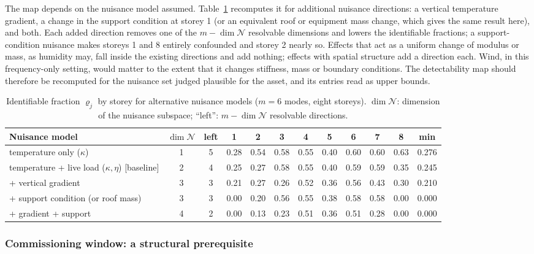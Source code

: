 \documentclass[12pt,a4paper]{article}
\newenvironment{revblock}{}{}
\newenvironment{revblock}{\begingroup\color{revcol}}{\endgroup}
\begin{document}
\begin{revblock}
The map depends on the nuisance model assumed. Table~\ref{tab:nuisance} recomputes it for additional nuisance directions: a vertical temperature gradient, a change in the support condition at storey 1 (or an equivalent roof or equipment mass change, which gives the same result here), and both. Each added direction removes one of the $m-\dim\mathcal N$ resolvable dimensions and lowers the identifiable fractions; a support-condition nuisance makes storeys 1 and 8 entirely confounded and storey 2 nearly so. Effects that act as a uniform change of modulus or mass, as humidity may, fall inside the existing directions and add nothing; effects with spatial structure add a direction each. Wind, in this frequency-only setting, would matter to the extent that it changes stiffness, mass or boundary conditions. The detectability map should therefore be recomputed for the nuisance set judged plausible for the asset, and its entries read as upper bounds.

\begin{table}[t]
\centering
\scriptsize
\caption{Identifiable fraction $\varrho_j$ by storey for alternative nuisance models ($m=6$ modes, eight storeys). $\dim\mathcal N$: dimension of the nuisance subspace; ``left'': $m-\dim\mathcal N$ resolvable directions.}
\label{tab:nuisance}
\setlength{\tabcolsep}{3pt}
\begin{tabular}{p{4.6cm}ccccccccccc}
\toprule
Nuisance model & $\dim\mathcal N$ & left & 1 & 2 & 3 & 4 & 5 & 6 & 7 & 8 & min \\
\midrule
temperature only ($\kappa$) & 1 & 5 & 0.28 & 0.54 & 0.58 & 0.55 & 0.40 & 0.60 & 0.60 & 0.63 & 0.276 \\
temperature + live load ($\kappa,\eta$)  [baseline] & 2 & 4 & 0.25 & 0.27 & 0.58 & 0.55 & 0.40 & 0.59 & 0.59 & 0.35 & 0.245 \\
+ vertical gradient & 3 & 3 & 0.21 & 0.27 & 0.26 & 0.52 & 0.36 & 0.56 & 0.43 & 0.30 & 0.210 \\
+ support condition (or roof mass) & 3 & 3 & 0.00 & 0.20 & 0.56 & 0.55 & 0.38 & 0.58 & 0.58 & 0.00 & 0.000 \\
+ gradient + support & 4 & 2 & 0.00 & 0.13 & 0.23 & 0.51 & 0.36 & 0.51 & 0.28 & 0.00 & 0.000 \\
\bottomrule
\end{tabular}
\end{table}
\end{revblock}

\subsubsection{Commissioning window: a structural prerequisite}\label{sec:res-comm}
\end{document}
